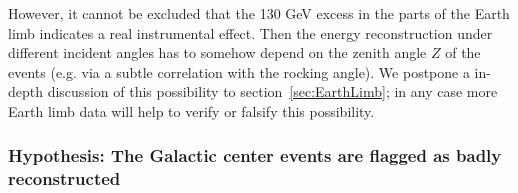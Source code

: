 \documentclass[aps,twocolumn,prd,superscriptaddress,showpacs,nofootinbib,fixfloat]{revtex4}
\begin{document}
However, it cannot be excluded that the 130 GeV excess in
the parts of the Earth limb indicates a real instrumental
effect. Then the energy
reconstruction under different incident angles has to somehow
depend on the zenith angle $Z$ of the events (e.g. via a
subtle correlation with the rocking angle).%
We postpone a in-depth discussion of this possibility to
section~\ref{sec:EarthLimb}; in any case more
Earth limb data will help to verify or falsify this possibility.

\subsubsection{Hypothesis: The Galactic center events are flagged as badly
reconstructed}
\end{document}
